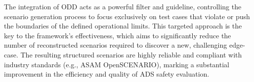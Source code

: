 \documentclass[a4paper,12pt]{report}
\begin{document}
{The integration of ODD acts as a powerful filter and guideline, controlling the scenario generation process to focus exclusively on test cases that violate or push the boundaries of the defined operational limits. This targeted approach is the key to the framework's effectiveness, which aims to significantly reduce the number of reconstructed scenarios required to discover a new, challenging edge-case. The resulting structured scenarios are highly reliable and compliant with industry standards (e.g., ASAM OpenSCENARIO), marking a substantial improvement in the efficiency and quality of ADS safety evaluation.
}
\newpage
\renewcommand{\contentsname}{สารบัญ}
\renewcommand{\listfigurename}{สารบัญรูป}
\renewcommand{\listtablename}{สารบัญตาราง}
\tableofcontents
\newpage
\listoffigures
\newpage
\listoftables

\cleardoublepage
\renewcommand{\thepage}{\arabic{page}}
\setcounter{page}{1}

\renewcommand{\figurename}{รูปที่}
\renewcommand{\tablename}{ตารางที่}
\renewcommand\bibname{บรรณานุกรม}









\end{document}
